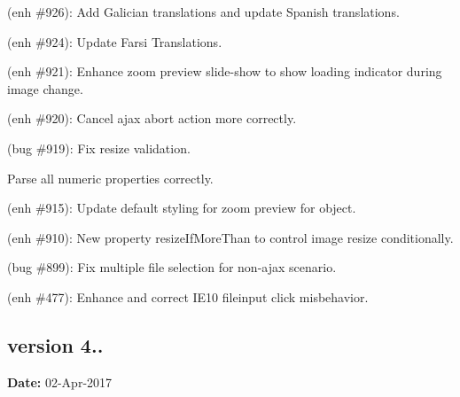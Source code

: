\begin{DoxyItemize}
\item (enh \#926)\+: Add Galician translations and update Spanish translations.
\item (enh \#924)\+: Update Farsi Translations.
\item (enh \#921)\+: Enhance zoom preview slide-\/show to show loading indicator during image change.
\item (enh \#920)\+: Cancel ajax abort action more correctly.
\item (bug \#919)\+: Fix resize validation.
\item Parse all numeric properties correctly.
\item (enh \#915)\+: Update default styling for zoom preview for object.
\item (enh \#910)\+: New property {\ttfamily resize\+If\+More\+Than} to control image resize conditionally.
\item (bug \#899)\+: Fix multiple file selection for non-\/ajax scenario.
\item (enh \#477)\+: Enhance and correct I\+E10 fileinput click misbehavior.
\end{DoxyItemize}

\subsection*{version 4..}

{\bfseries Date\+:} 02-\/\+Apr-\/2017


